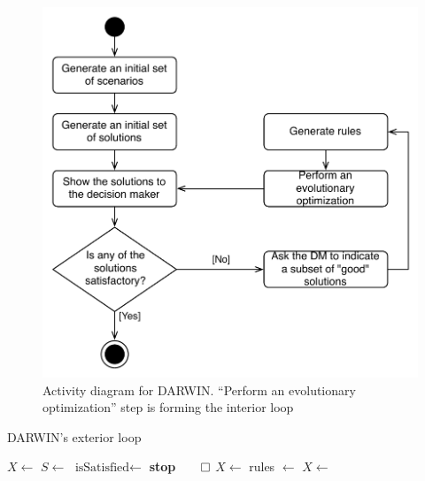 \begin{figure} 
  \begin{center}
    \includegraphics[scale=0.65]{img/darwin.pdf}
    \caption{Activity diagram for DARWIN. ``Perform an evolutionary
      optimization'' step is forming the interior loop 
      \label{fig:darwin-ext}}
  \end{center} 
\end{figure}

\begin{algorithm}
\caption{DARWIN's exterior loop}\label{alg:extloop}
  \begin{algorithmic}[1]
    \State $X \gets$  \label{algin:solgen}
    \State $S \gets$  \label{algin:scengen}
    \Loop
     \label{algin:evstart} 
    \State {} 
    \EndFor{} \label{algin:evstop}
    \State $\text{isSatisfied} \gets$  \label{algin:dmshow}
    \State \textbf{stop}$\qed$ 
    \Else
    \State $X \gets$  \label{algin:dmmark}
    \EndIf
    \State rules $\gets$  \label{algin:rules}
    \State $X \gets$   \label{algin:intloop}
    \EndLoop{}
  \end{algorithmic}
\end{algorithm}


